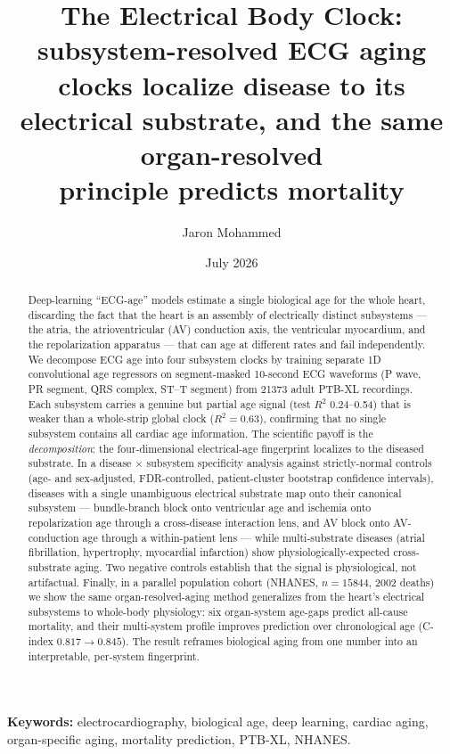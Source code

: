 \documentclass[11pt]{article}
\title{\textbf{The Electrical Body Clock:\\
subsystem-resolved ECG aging clocks localize disease to its\\
electrical substrate, and the same organ-resolved\\
principle predicts mortality}}
\author{Jaron Mohammed}
\date{July 2026}
\begin{document}
\maketitle

\begin{abstract}
\noindent Deep-learning ``ECG-age'' models estimate a single biological age for the whole
heart, discarding the fact that the heart is an assembly of electrically distinct
subsystems --- the atria, the atrioventricular (AV) conduction axis, the ventricular
myocardium, and the repolarization apparatus --- that can age at different rates and fail
independently. We decompose ECG age into four subsystem clocks by training separate 1D
convolutional age regressors on segment-masked 10-second ECG waveforms (P wave, PR segment,
QRS complex, ST--T segment) from \num{21373} adult PTB-XL recordings. Each subsystem carries
a genuine but partial age signal (test $R^2$ 0.24--0.54) that is weaker than a whole-strip
global clock ($R^2=0.63$), confirming that no single subsystem contains all cardiac age
information. The scientific payoff is the \emph{decomposition}: the four-dimensional
electrical-age fingerprint localizes to the diseased substrate. In a disease $\times$
subsystem specificity analysis against strictly-normal controls (age- and sex-adjusted,
FDR-controlled, patient-cluster bootstrap confidence intervals), diseases with a single
unambiguous electrical substrate map onto their canonical subsystem --- bundle-branch block
onto ventricular age and ischemia onto repolarization age through a cross-disease
interaction lens, and AV block onto AV-conduction age through a within-patient lens --- while
multi-substrate diseases (atrial fibrillation, hypertrophy, myocardial infarction) show
physiologically-expected cross-substrate aging. Two negative controls establish that the
signal is physiological, not artifactual. Finally, in a parallel population cohort (NHANES,
$n=\num{15844}$, \num{2002} deaths) we show the same organ-resolved-aging method generalizes
from the heart's electrical subsystems to whole-body physiology: six organ-system age-gaps
predict all-cause mortality, and their multi-system profile improves prediction over
chronological age (C-index $0.817 \rightarrow 0.845$). The result reframes biological aging
from one number into an interpretable, per-system fingerprint.
\end{abstract}

\vspace{0.5em}
\noindent\textbf{Keywords:} electrocardiography, biological age, deep learning, cardiac
aging, organ-specific aging, mortality prediction, PTB-XL, NHANES.
\end{document}
